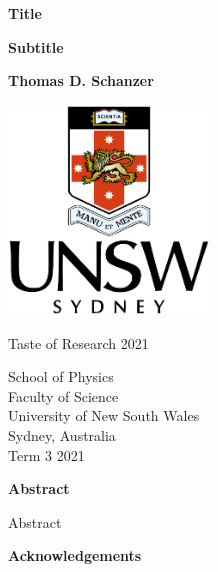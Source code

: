 \documentclass[12pt,titlepage]{article}
\begin{document}
% 

\begin{titlepage}
    \begin{center}
        
        \vspace{1cm} 
        \Huge
        \textbf{Title}
        
        \Large
        \textbf{Subtitle}
            
        \vspace{0.75cm}
            
        \textbf{Thomas D. Schanzer}
            
        \vspace{1.5cm}
            
        \includegraphics[width=0.4\textwidth]{unsw}

        \vspace{1cm}

        \large    
        Taste of Research 2021

        \vspace{1cm}
            
        \large
        School of Physics\\
        Faculty of Science\\
        University of New South Wales\\
        Sydney, Australia\\
        \vspace{0.5cm}
        Term 3 2021
        \vfil
            
    \end{center}
\end{titlepage}

\begin{center}
	\large
	\textbf{Abstract}
\end{center}

Abstract

\begin{center}
	\large
	\textbf{Acknowledgements}
\end{center}
\end{document}
